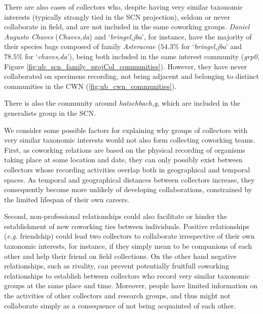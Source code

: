 There are also cases of collectors who, despite having very similar taxonomic interests (typically strongly tied in the SCN projection), seldom or never collaborate in field, and are not included in the same coworking groups.
\textit{Daniel Augusto Chaves} (\textit{Chaves,da}) and `\textit{bringel,jba}', for instance, have the majority of their species bags composed of family \textit{Asteraceae} ($54.3\%$ for `\textit{bringel,jba}' and $78.5\%$ for `\textit{chaves,da}'), being both included in the same interest community (\textit{grp0}, Figure \ref{fig:ub_scn_family_projCol_communities}).
However, they have never collaborated on specimens recording, not being adjacent and belonging to distinct communities in the CWN (\ref{fig:ub_cwn_communities}).

There is also the community around \textit{hatschbach,g}, which are included in the generalists group in the SCN.

We consider some possible factors for explaining why groups of collectors with very similar taxonomic interests would not also form collecting coworking teams.
%
First, as coworking relations are based on the physical recording of organisms taking place at some location and date, they can only possibly exist between collectors whose recording activities overlap both in geographical and temporal spaces.
As temporal and geographical distances between collectors increase, they consequently become more unlikely of developing collaborations, constrained by the limited lifespan of their own careers.

Second, non-professional relationships could also facilitate or hinder the establishment of new coworking ties between individuals. 
Positive relationships (\textit{e.g.} friendship) could lead two collectors to collaborate irrespective of their own taxonomic interests, for instance, if they simply mean to be companions of each other and help their friend on field collections.
On the other hand negative relationships, such as rivality, can prevent potentially fruitfull coworking relationships to establish between collectors who record very similar taxonomic groups at the same place and time.
Moreover, people have limited information on the activities of other collectors and research groups, and thus might not collaborate simply as a consequence of not being acquainted of each other.

